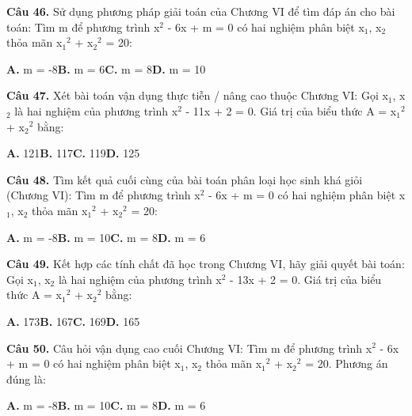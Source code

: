 \documentclass[11pt,a4paper]{article}
\begin{document}
\textbf{\color{primary} Câu 46.} Sử dụng phương pháp giải toán của Chương VI để tìm đáp án cho bài toán: Tìm m để phương trình x$^2$ - 6x + m = 0 có hai nghiệm phân biệt x$_1$, x$_2$ thỏa mãn x$_1$$^2$ + x$_2$$^2$ = 20:\par
\hspace*{1.5em}\textbf{A.} m = -8\quad\quad \textbf{B.} m = 6\quad\quad \textbf{C.} m = 8\quad\quad \textbf{D.} m = 10\par\vspace{2pt}
\textbf{\color{primary} Câu 47.} Xét bài toán vận dụng thực tiễn / nâng cao thuộc Chương VI: Gọi x$_1$, x$_2$ là hai nghiệm của phương trình x$^2$ - 11x + 2 = 0. Giá trị của biểu thức A = x$_1$$^2$ + x$_2$$^2$ bằng:\par
\hspace*{1.5em}\textbf{A.} 121\quad\quad \textbf{B.} 117\quad\quad \textbf{C.} 119\quad\quad \textbf{D.} 125\par\vspace{2pt}
\textbf{\color{primary} Câu 48.} Tìm kết quả cuối cùng của bài toán phân loại học sinh khá giỏi (Chương VI): Tìm m để phương trình x$^2$ - 6x + m = 0 có hai nghiệm phân biệt x$_1$, x$_2$ thỏa mãn x$_1$$^2$ + x$_2$$^2$ = 20:\par
\hspace*{1.5em}\textbf{A.} m = -8\quad\quad \textbf{B.} m = 10\quad\quad \textbf{C.} m = 8\quad\quad \textbf{D.} m = 6\par\vspace{2pt}
\textbf{\color{primary} Câu 49.} Kết hợp các tính chất đã học trong Chương VI, hãy giải quyết bài toán: Gọi x$_1$, x$_2$ là hai nghiệm của phương trình x$^2$ - 13x + 2 = 0. Giá trị của biểu thức A = x$_1$$^2$ + x$_2$$^2$ bằng:\par
\hspace*{1.5em}\textbf{A.} 173\quad\quad \textbf{B.} 167\quad\quad \textbf{C.} 169\quad\quad \textbf{D.} 165\par\vspace{2pt}
\textbf{\color{primary} Câu 50.} Câu hỏi vận dụng cao cuối Chương VI: Tìm m để phương trình x$^2$ - 6x + m = 0 có hai nghiệm phân biệt x$_1$, x$_2$ thỏa mãn x$_1$$^2$ + x$_2$$^2$ = 20. Phương án đúng là:\par
\hspace*{1.5em}\textbf{A.} m = -8\quad\quad \textbf{B.} m = 10\quad\quad \textbf{C.} m = 8\quad\quad \textbf{D.} m = 6\par\vspace{2pt}
\end{document}
